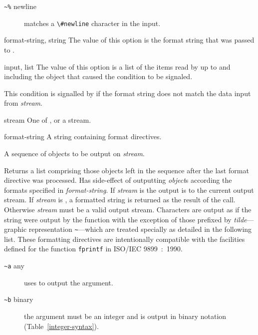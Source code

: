 \begin{optDefinition}
\begin{description}
    \item[{\tt\textasciitilde \%} newline] matches a \verb+\#newline+ character in the
    input.
\end{description}

%
\begin{initoptions}
    \item[format-string, string] The value of this option is the format string
    that was passed to .
    \item[input, list] The value of this option is a list of the items read by
     up to and including the object that caused the condition
    to be signaled.
\end{initoptions}
%
\remarks%
This condition is signalled by  if the format string does not
match the data input from {\em stream}.

%
\begin{arguments}
    \item[stream] One of \nil, \true\/ or a stream.
    \item[format-string] A string containing format directives.
    \item[\optional{object$_1$ \ldots}] A sequence of objects to be output
    on {\em stream}.
\end{arguments}
%
\result%
Returns a list comprising those objects left in the sequence after the
last format directive was processed.
%
\remarks%
Has side-effect of outputting {\em object\/}s according the formats specified in
{\em format-string}.  If {\em stream\/} is \true\/ the output is to the current
output stream.  If {\em stream\/} is \nil, a formatted string is returned as the
result of the call.  Otherwise {\em stream\/} must be a valid output stream.
Characters are output as if the string were output by the 
function with the exception of those prefixed by {\em tilde\/}---graphic
representation {\tt\textasciitilde}---which are treated specially as detailed in
the following list.  These formatting directives are intentionally compatible
with the facilities defined for the function {\tt fprintf} in ISO/IEC
9899~:~1990.
%
\begin{description}
    \item[{\tt\textasciitilde a} any]%
    uses  to output the argument.

    \item[{\tt\textasciitilde b} binary]%
    the argument must be an integer and is output in binary notation
    (Table~\ref{integer-syntax}).


\end{description}
\end{optDefinition}
